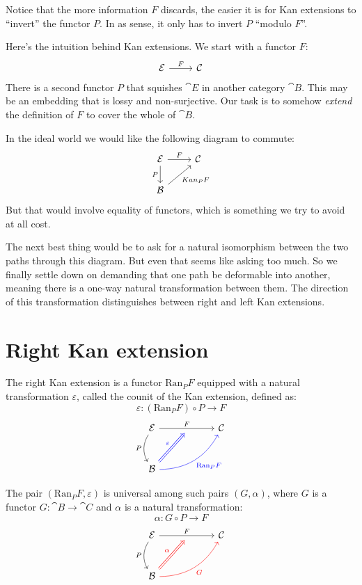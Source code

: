 \documentclass[DaoFP]{subfiles}
\begin{document}
Notice that the more information $F$ discards, the easier it is for Kan extensions to ``invert'' the functor $P$. In as sense, it only has to invert $P$ ``modulo $F$''.

Here's the intuition behind Kan extensions. We start with a functor $F$:
\[
 \begin{tikzcd} \cat E
 \arrow[r, "F"]
 & \cat C
  \end{tikzcd}
\]
There is a second functor $P$ that squishes $\cat E$ in another category $\cat B$. This may be an embedding that is lossy and non-surjective. Our task is to somehow \emph{extend} the definition of $F$ to cover the whole of $\cat B$. 

In the ideal world we would like the following diagram to commute:
\[
 \begin{tikzcd} \cat E
 \arrow[r, "F"]
 \arrow[d, "P"']
 & \cat C
 \\
 \cat B
\arrow[ur, "Kan_P F"']
  \end{tikzcd}
\]
But that would involve equality of functors, which is something we try to avoid at all cost. 

The next best thing would be to ask for a natural isomorphism between the two paths through this diagram. But even that seems like asking too much. So we finally settle down on demanding that one path be deformable into another, meaning there is a one-way natural transformation between them. The direction of this transformation distinguishes between right and left Kan extensions.

\section{Right Kan extension}

The right Kan extension is a functor $\text{Ran}_P F$ equipped with a natural transformation $\varepsilon$, called the counit of the Kan extension, defined as:
\[ \varepsilon \colon (\text{Ran}_P F) \circ P \to F\]
\[
 \begin{tikzcd} [row sep=1cm, column sep=1cm]
 \cat E
 \arrow[rr, "F", "" {name=ID, below} ]
 \arrow[d, bend right, "P"']
 && \cat C
 \\
 \cat B
  \arrow[urr, blue, bend right, "\text{Ran}_P F"']
 \arrow[Rightarrow, blue, "\varepsilon",  to=ID]
 \end{tikzcd}
\]

The pair $(\text{Ran}_P F, \varepsilon)$ is universal among such pairs $(G, \alpha)$, where $G$ is a functor $G \colon \cat B \to \cat C$ and $\alpha$ is a natural transformation:
\[ \alpha \colon G \circ P \to F \]
\[
 \begin{tikzcd} [row sep=1cm, column sep=1cm]
 \cat E
 \arrow[rr, "F", "" {name=ID, below} ]
 \arrow[d, bend right, "P"']
 && \cat C
 \\
 \cat B
  \arrow[urr, red, bend right, "G"']
 \arrow[Rightarrow, red, "\alpha",  to=ID]
 \end{tikzcd}
\]
\end{document}
